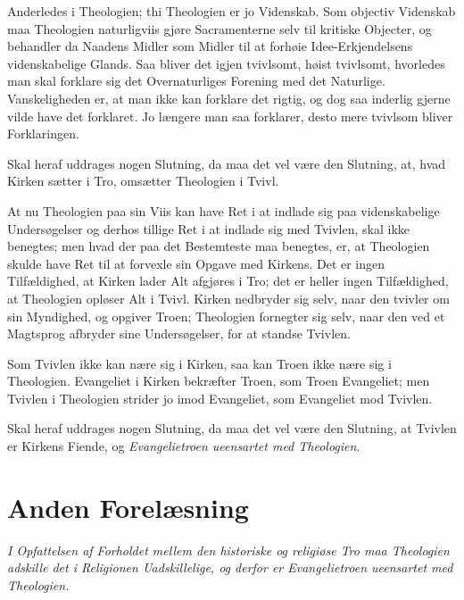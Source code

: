 \documentclass[12pt,a4paper]{book}
\newcommand{\opage}[1]{\marginnote{\footnotesize\textit{[#1]}}}
\begin{document}
\opage{13} Anderledes i Theologien; thi Theologien er jo Videnskab. Som objectiv
Videnskab maa Theologien naturligviis gjøre Sacramenterne selv til
kritiske Objecter, og behandler da Naadens Midler som Midler til at
forhøie Idee-Erkjendelsens videnskabelige Glands. Saa bliver det igjen
tvivlsomt, høist tvivlsomt, hvorledes man skal forklare sig det
Overnaturliges Forening med det Naturlige. Vanskeligheden er, at man ikke
kan forklare det rigtig, og dog saa inderlig gjerne vilde have det
forklaret. Jo længere man saa forklarer, desto mere tvivlsom bliver
Forklaringen.

Skal heraf uddrages nogen Slutning, da maa det vel være den Slutning, at,
hvad Kirken sætter i Tro, omsætter Theologien i Tvivl.

At nu Theologien paa sin Viis kan have Ret i at indlade sig paa
videnskabelige Undersøgelser og derhos tillige Ret i at indlade sig med
Tvivlen, skal ikke benegtes; men hvad der paa det Bestemteste maa
benegtes, er, at Theologien skulde have Ret til at forvexle sin Opgave
med Kirkens. Det er ingen Tilfældighed, at Kirken lader Alt afgjøres i
Tro; det er heller ingen Tilfældighed, at Theologien opløser Alt i
Tvivl. Kirken nedbryder sig selv, naar den tvivler om sin Myndighed, og
opgiver Troen; Theologien fornegter sig selv, naar den ved et Magtsprog
afbryder sine Undersøgelser, for at standse Tvivlen.

Som Tvivlen ikke kan nære sig i Kirken, saa kan Troen ikke nære sig i
Theologien. Evangeliet i Kirken bekræfter Troen, som Troen Evangeliet;
men Tvivlen i Theologien strider jo imod Evangeliet, som Evangeliet mod
Tvivlen.

Skal heraf uddrages nogen Slutning, da maa det vel være den Slutning, at
Tvivlen er Kirkens Fiende, og \emph{Evangelietroen ueensartet med
Theologien}.

\chapter*{Anden Forelæsning}
\label{ch:forel2}

\begin{center}\itshape
I Opfattelsen af Forholdet mellem den historiske og religiøse Tro maa
Theologien adskille det i Religionen Uadskillelige, og derfor er
Evangelietroen ueensartet med Theologien.
\end{center}
\end{document}
